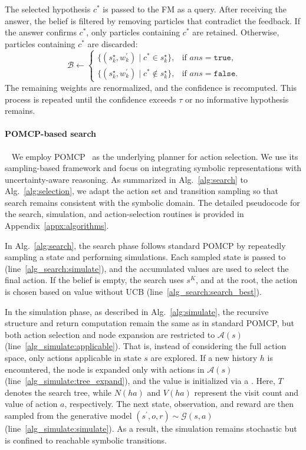 The selected hypothesis $c^{*}$ is passed to the FM as a query. After receiving the answer, the belief is filtered by removing particles that contradict the feedback. If the answer confirms $c^{*}$, only particles containing $c^{*}$ are retained. Otherwise, particles containing $c^{*}$ are discarded:
\begin{equation}~\label{eq:filter}
\mathcal{B} \leftarrow
\begin{cases}
\{(s_k^{\star}, w_k^\prime) \mid c^{*} \in s_k^{\star}\}, & \text{if } ans = \texttt{true}, \\
\{(s_k^{\star}, w_k^\prime) \mid c^{*} \notin s_k^{\star}\}, & \text{if } ans = \texttt{false}.
\end{cases}
\end{equation}
The remaining weights are renormalized, and the confidence is recomputed. This process is repeated until the confidence exceeds $\tau$ or no informative hypothesis remains.





\paragraph{POMCP-based search}~\label{methd:POMCP}
We employ POMCP~\cite{silver2010monte} as the underlying planner for action selection. We use its sampling-based framework and focus on integrating symbolic representations with uncertainty-aware reasoning. As summarized in Alg.~\ref{alg:search} to Alg.~\ref{alg:selection}, we adapt the action set and transition sampling so that search remains consistent with the symbolic domain. The detailed pseudocode for the search, simulation, and action-selection routines is provided in Appendix~\ref{appx:algorithms}.

In Alg.~\ref{alg:search}, the search phase follows standard POMCP by repeatedly sampling a state and performing simulations. Each sampled state is passed to \Simulate (line~\ref{alg_search:simulate}), and the accumulated values are used to select the final action. If the belief is empty, the search uses $s^{K}$, and at the root, the action is chosen based on value without UCB (line~\ref{alg_search:search_best}).


In the simulation phase, as described in Alg.~\ref{alg:simulate}, the recursive structure and return computation remain the same as in standard POMCP, but both action selection and node expansion are restricted to $\mathcal{A}(s)$ (line~\ref{alg_simulate:applicable}). That is, instead of considering the full action space, only actions applicable in state $s$ are explored. If a new history $h$ is encountered, the node is expanded only with actions in $\mathcal{A}(s)$ (line~\ref{alg_simulate:tree_expand}), and the value is initialized via a \Rollout. Here, $T$ denotes the search tree, while $N(ha)$ and $V(ha)$ represent the visit count and value of action $a$, respectively. The next state, observation, and reward are then sampled from the generative model $(s^\prime, o, r) \sim \mathcal{G}(s,a)$ (line~\ref{alg_simulate:simulate}). As a result, the simulation remains stochastic but is confined to reachable symbolic transitions.

